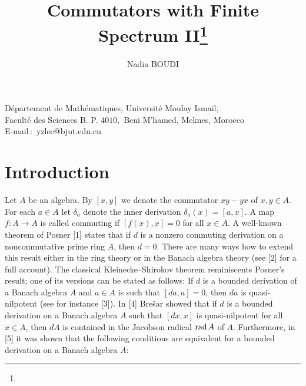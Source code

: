 \documentclass{amse}
\numberwithin{equation}{section}
\begin{document}




\title{Commutators with Finite Spectrum II\footnote{}}

\author{Nadia BOUDI}
    {D\'epartement de Math\'ematiques, Universit\'e  Moulay
Ismail,\\ Facult\'e des Sciences B. P. $4010,$ Beni M'hamed,
Meknes, Morocco\\
    E-mail\,$:$ yzlee@bjut.edu.cn}


\maketitle




\newcommand{\socle}{{\rm Soc}\,}
\newcommand{\radic}{{\rm rad}\,}
\newcommand{\densA}{{\mathscr A}}
\newcommand{\Primi}{{\rm Prim}}
\newcommand{\rg}{{\rm rank}\,}
\newcommand{\dime}{{\rm dim}\,}
\newcommand{\Kern}{{\rm Ker}\,}

\section{Introduction}


 Let $A$ be an algebra. By $[x,y]$ we denote the commutator
$xy-yx$ of $x,y \in A$.  For each $a \in A$ let $\delta_a$ denote
the inner derivation $\delta_a(x)= [a,x]$. A map $f: A\rightarrow
A$ is called commuting  if $ [f(x),x]=0$ for all $x \in A$. A
well-known theorem of Posner [1] states that if $d$ is a nonzero
commuting derivation on a noncommutative prime ring $A$, then $d =
0$. There are many ways how to extend this result either in the
ring theory or in the Banach algebra theory (see [2] for a full
account). The  classical  Kleinecke--Shirokov theorem
 reminiscents Posner's result; one of its versions can be stated as follows:
 If $d$ is a bounded derivation of a Banach algebra
$A$ and $a\in A$ is such that $[da,a] =0$, then $da$ is
quasi-nilpotent (see for instance [3]).  In [4] Bre\v sar
 showed that if $d$ is a bounded
derivation on a Banach algebra $A$ such that $[dx,x]$ is
quasi-nilpotent for all $x \in A$, then $dA$ is contained in the
Jacobson radical  $\radic A $ of $A$. Furthermore, in [5] it was
shown that the following  conditions are equivalent for a bounded
derivation on a Banach algebra $A$:
\end{document}
